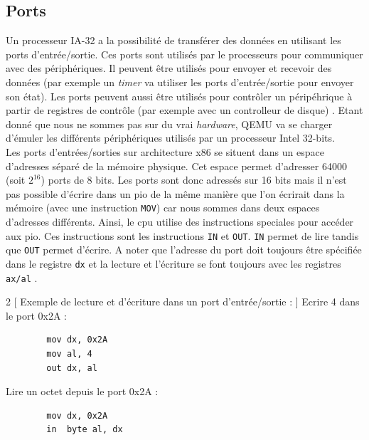 \label{peripherals}

\subsection{Ports}
Un processeur \acrshort{IA-32} a la possibilité de transférer des données en utilisant
les ports d'entrée/sortie. Ces ports sont utilisés par le processeurs pour communiquer
avec des périphériques. Il peuvent être utilisés pour envoyer et recevoir des données
(par exemple un \textit{timer} va utiliser les ports d'entrée/sortie pour envoyer
son état). Les ports peuvent aussi être utilisés pour contrôler un péripéhrique
à partir de registres de contrôle (par exemple avec un controlleur de disque) \cite{ref64}.
Etant donné que nous ne sommes pas sur du vrai \textit{hardware}, QEMU va se charger
d'émuler les différents périphériques utilisés par un processeur Intel 32-bits. \\

Les ports d'entrées/sorties sur architecture x86 se situent dans un espace d'adresses
séparé de la mémoire physique. Cet espace permet d'adresser 64000 (soit $2^{16}$)
ports de 8 bits. Les ports sont donc adressés sur 16 bits mais  il n'est pas possible
d'écrire dans un \acrshort{pio} de la même manière que l'on écrirait dans la mémoire
(avec une instruction  \texttt{MOV}) car nous sommes dans deux
espaces d'adresses différents. Ainsi, le \acrshort{cpu} utilise des instructions speciales
pour accéder aux \acrshort{pio}. Ces instructions sont les instructions
\texttt{IN} et \texttt{OUT}. \texttt{IN} permet de lire
tandis que \texttt{OUT} permet d'écrire. A noter que l'adresse du port
doit toujours être spécifiée dans le registre \texttt{dx} et la lecture
et l'écriture se font toujours avec les registres \texttt{ax/al} \cite{ref42}. \\

\begin{multicols}{2}
    [
    Exemple de lecture et d'écriture dans un port d'entrée/sortie :
    ]
    Ecrire 4 dans le port 0x2A :
    \begin{verbatim}
        mov dx, 0x2A
        mov al, 4
        out dx, al
    \end{verbatim}
    \columnbreak
    Lire un octet depuis le port 0x2A :
    \begin{verbatim}
        mov dx, 0x2A
        in  byte al, dx
    \end{verbatim}
\end{multicols}

